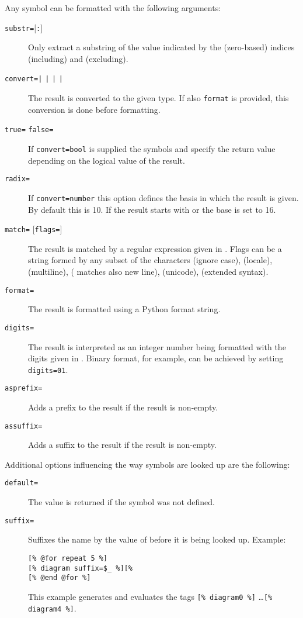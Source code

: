 \documentclass[11pt,a4paper]{refrep}
\begin{document}
Any symbol can be formatted with the following arguments:
\begin{description}
\item[\texttt{substr=}{[\texttt{:}]}]
   Only extract a substring of the value indicated by the (zero-based)
   indices  (including) and  (excluding).
\item[\texttt{convert=}{\texttt{|}%
   \texttt{|}%
   \texttt{|}%
   \texttt{|}}]
   The result is converted to the given type. If also \texttt{format}
   is provided, this conversion is done before formatting.
\item[\texttt{true=} \texttt{false=}]
   If \texttt{convert=bool} is supplied the symbols 
   and  specify the return value depending on the
   logical value of the result.
\item[\texttt{radix=}] If \texttt{convert=number} this
   option defines the basis in which the result is given. By default
   this is 10. If the result starts with  or \lit{\$} the
   base is set to 16.
\item[\texttt{match=} {[\texttt{flags=}]}]
   The result is matched by a regular expression given in
   . Flags can be a string formed by any subset of the characters
    (ignore case),  (locale),  (multiline),
    ( matches also new line),  (unicode),
    (extended syntax).
\item[\texttt{format=}]
   The result is formatted using a Python format string.
\item[\texttt{digits=}] The result is interpreted as an integer
   number being formatted with the digits given in . Binary format,
   for example, can be achieved by setting \texttt{digits=01}.
\item[\texttt{asprefix=}] Adds a prefix to the result if
   the result is non-empty.
\item[\texttt{assuffix=}] Adds a suffix to the result if the
   result is non-empty.
\end{description}
\bigskip

Additional options influencing the way symbols are looked up are the following:
\begin{description}
\item[\texttt{default=}] The value  is returned if
   the symbol was not defined.
\item[\texttt{suffix=}] Suffixes the name by the value of 
   before it is being looked up.
   Example:
\begin{lstlisting}
[% @for repeat 5 %]
[% diagram suffix=$_ %][%
[% @end @for %]
\end{lstlisting}
   This example generates and evaluates the tags \lstinline|[% diagram0 %]|
   \ldots \lstinline|[% diagram4 %]|.
\end{description}
\end{document}
